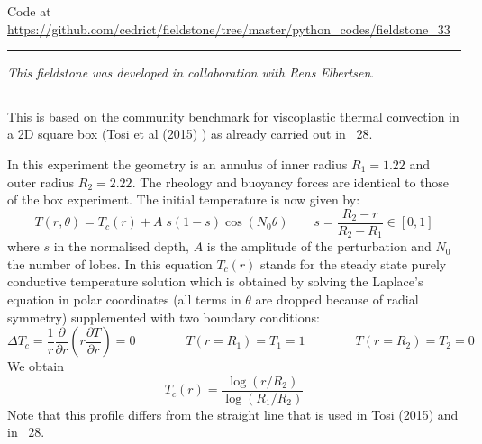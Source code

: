 

\begin{center}
Code at \url{https://github.com/cedrict/fieldstone/tree/master/python_codes/fieldstone_33}
\end{center}

\par\noindent\rule{\textwidth}{0.4pt}

{\sl This fieldstone was developed in collaboration with Rens Elbertsen}. 

\par\noindent\rule{\textwidth}{0.4pt}



This is based on the community benchmark for viscoplastic thermal convection
in a 2D square box (Tosi et al (2015) \cite{tosn15}) as already carried out in \stone~28.

In this experiment the geometry is an annulus of inner radius 
$R_1=1.22$ and outer radius $R_2=2.22$. 
The rheology and buoyancy forces are identical to those of the box 
experiment. The initial temperature is now given by:
\[
T(r,\theta) = T_c(r)+A\; s(1-s) \cos(N_0 \theta)
\quad\quad s=\frac{R_2-r}{R_2-R_1} \in [0,1]
\]
where $s$ in the normalised depth, $A$ is the amplitude of the perturbation and $N_0$ the 
number of lobes. In this equation $T_c(r)$ stands for the steady state purely conductive 
temperature solution which is obtained by solving the Laplace's equation in 
polar coordinates (all terms in $\theta$ are dropped because of radial symmetry) 
supplemented with two boundary conditions:
\[
\Delta T_c = \frac{1}{r}\frac{\partial }{\partial r} \left( r \frac{\partial T}{\partial r} \right) =0 
\quad\quad
\quad\quad
T(r=R_1)=T_1=1
\quad\quad
\quad\quad
T(r=R_2)=T_2=0
\]
We obtain 
\[
T_c(r)=\frac{\log (r/R_2)}{\log(R_1/R_2)}
\]
Note that this profile differs from the straight line that is used in Tosi \etal (2015) \cite{tosn15} 
and in \stone~28.

